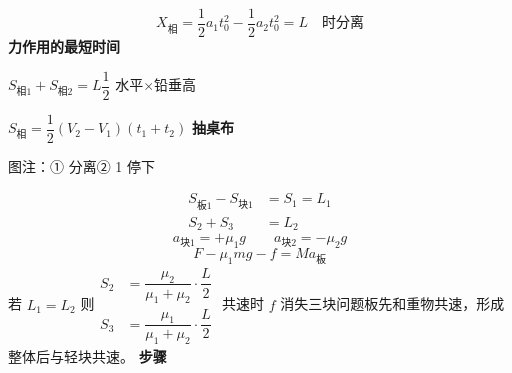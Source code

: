 \[
X_{\text{相}}=\frac12a_1t_0^2-\frac12a_2t_0^2=L\quad\text{时分离}
\]
\textbf{力作用的最短时间}

\noindent $S_{\text{相}1}+S_{\text{相}2}=L$\quad $\dfrac12$ 水平$\times$铅垂高

\noindent $S_{\text{相}}=\dfrac12(V_2-V_1)(t_1+t_2)$
\textbf{抽桌布}

\noindent 图注：① 分离\quad ② 1 停下

\begin{align*}
S_{\text{板}1}-S_{\text{块}1}&=S_1=L_1\\
S_2+S_3&=L_2
\end{align*}
\[
a_{\text{块}1}=+\mu_1g\qquad a_{\text{块}2}=-\mu_2g
\]
\[
F-\mu_1mg-f=Ma_{\text{板}}
\]
\noindent 若 $L_1=L_2$ 则\quad $\begin{aligned}S_2&=\dfrac{\mu_2}{\mu_1+\mu_2}\cdot\dfrac L2\\[4pt] S_3&=\dfrac{\mu_1}{\mu_1+\mu_2}\cdot\dfrac L2\end{aligned}$
\noindent 共速时 $f$ 消失\qquad 三块问题\qquad 板先和重物共速，形成整体后与轻块共速。
\textbf{步骤}

